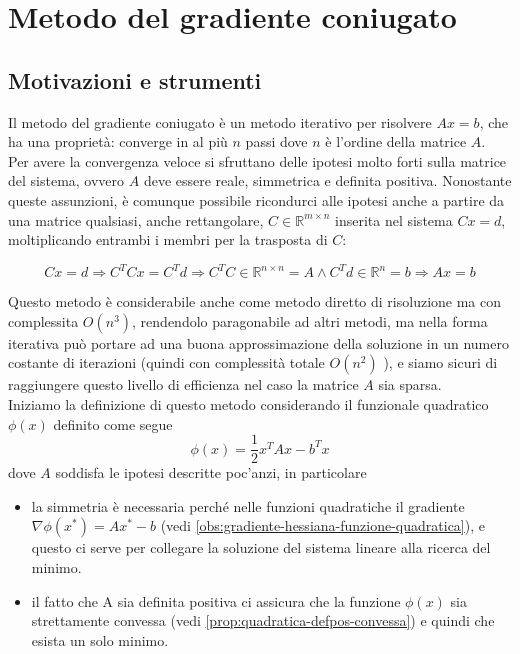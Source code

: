 

\inbpdocument 

\chapter{Metodo del gradiente coniugato}
\label{chap:metodo-gradiente-coniugato}
\section{Motivazioni e strumenti} Il metodo del gradiente coniugato \`e
un metodo iterativo per risolvere $Ax = b$, che ha una proprietà:
converge in al più $n$ passi dove $n$ \`e l'ordine della matrice $A$.\\
Per avere la convergenza veloce si sfruttano delle ipotesi molto forti
sulla matrice del sistema, ovvero $A$ deve essere reale, simmetrica e
definita positiva.  Nonostante queste assunzioni, \`e comunque possibile
ricondurci alle ipotesi anche a partire da una matrice qualsiasi,
anche rettangolare, $C \in \mathbb{R}^{m \times n}$ inserita nel
sistema $C x = d$, moltiplicando entrambi i membri per la trasposta di
$C$:

$$ Cx = d \Rightarrow C^{T}Cx = C^{T} d \Rightarrow C^{T}C \in \mathbb {R}^ {n \times n} = A \wedge  C^{T}d \in \mathbb {R}^{n} = b \Rightarrow Ax = b $$ 

Questo metodo \`e considerabile anche come metodo diretto di risoluzione
ma con complessita $O(n^{3})$, rendendolo paragonabile ad altri
metodi, ma nella forma iterativa può portare ad una buona
approssimazione della soluzione in un numero costante di iterazioni
(quindi con complessità totale $O(n^{2})$ ), e siamo sicuri di
raggiungere questo livello di efficienza nel caso la matrice $A$ sia
sparsa.\\

Iniziamo la definizione di questo metodo considerando il funzionale
quadratico $\phi(x)$ definito come segue
$$ \phi(x) = \frac{1}{2}x^{T} A x - b^{T}x$$
dove $A$ soddisfa le ipotesi descritte poc'anzi, in particolare 
\begin{itemize}
\item la simmetria \`e necessaria perché nelle funzioni quadratiche
  il gradiente $\nabla \phi(x^{*}) = Ax^{*} - b$
  (vedi \ref{obs:gradiente-hessiana-funzione-quadratica}), e questo ci serve
  per collegare la soluzione del sistema lineare alla ricerca del minimo.
\item il fatto che A sia definita positiva ci assicura che la funzione
  $\phi(x)$ sia strettamente convessa
  (vedi \ref{prop:quadratica-defpos-convessa}) e quindi che esista un solo
  minimo.
\end{itemize}

